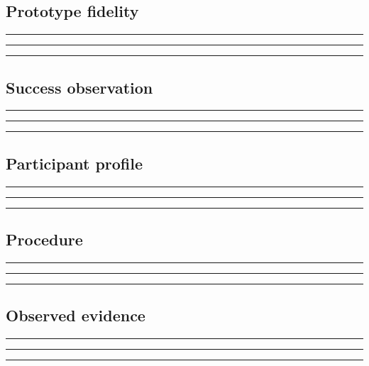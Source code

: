 \documentclass[11pt]{article}
\begin{document}
\subsection{Prototype fidelity}
\noindent\rule{\linewidth}{0.3pt}\par\vspace{0.18in}
\noindent\rule{\linewidth}{0.3pt}\par\vspace{0.18in}
\noindent\rule{\linewidth}{0.3pt}\par\vspace{0.14in}

\subsection{Success observation}
\noindent\rule{\linewidth}{0.3pt}\par\vspace{0.18in}
\noindent\rule{\linewidth}{0.3pt}\par\vspace{0.18in}
\noindent\rule{\linewidth}{0.3pt}\par\vspace{0.14in}

\subsection{Participant profile}
\noindent\rule{\linewidth}{0.3pt}\par\vspace{0.18in}
\noindent\rule{\linewidth}{0.3pt}\par\vspace{0.18in}
\noindent\rule{\linewidth}{0.3pt}\par\vspace{0.14in}

\subsection{Procedure}
\noindent\rule{\linewidth}{0.3pt}\par\vspace{0.18in}
\noindent\rule{\linewidth}{0.3pt}\par\vspace{0.18in}
\noindent\rule{\linewidth}{0.3pt}\par\vspace{0.14in}

\subsection{Observed evidence}
\noindent\rule{\linewidth}{0.3pt}\par\vspace{0.18in}
\noindent\rule{\linewidth}{0.3pt}\par\vspace{0.18in}
\noindent\rule{\linewidth}{0.3pt}\par\vspace{0.14in}
\end{document}
